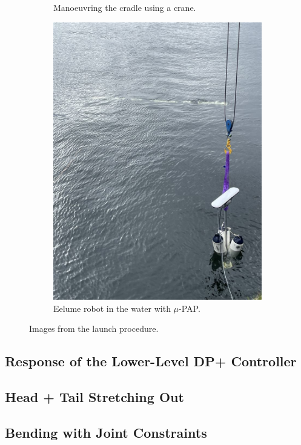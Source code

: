 \begin{figure}
\begin{subfigure}{0.26\textwidth}
        \caption{Manoeuvring the cradle using a crane.}
    \end{subfigure}
    \begin{subfigure}{0.26\textwidth}
        \centering
        \includegraphics[width=\textwidth]{assets/launch/1.jpeg}
        \caption{Eelume robot in the water with \(\mu\)-PAP.}
    \end{subfigure}
    \caption{Images from the launch procedure.}
    \label{fig:eelume:cradle-and-float}
\end{figure}

\subsection*{Response of the Lower-Level DP+ Controller}
\subsection*{Head + Tail Stretching Out}
\subsection*{Bending with Joint Constraints}

